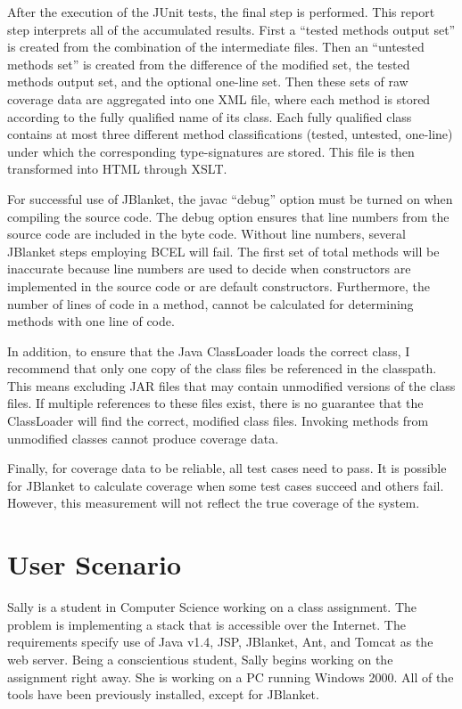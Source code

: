 After the execution of the JUnit tests, the final step is performed. This
report step interprets all of the accumulated results. First a ``tested
methods output set'' is created from the combination of the intermediate
files.  Then an ``untested methods set'' is created from the difference of
the modified set, the tested methods output set, and the optional one-line
set. Then these sets of raw coverage data are aggregated into one XML file,
where each method is stored according to the fully qualified name of its
class. Each fully qualified class contains at most three different method
classifications (tested, untested, one-line) under which the corresponding
type-signatures are stored. This file is then transformed into HTML through
XSLT.

For successful use of JBlanket, the javac ``debug'' option must be turned
on when compiling the source code. The debug option ensures that line
numbers from the source code are included in the byte code. Without line
numbers, several JBlanket steps employing BCEL will fail.  The first set of
total methods will be inaccurate because line numbers are used to decide
when constructors are implemented in the source code or are default
constructors.  Furthermore, the number of lines of code in a method, cannot
be calculated for determining methods with one line of code.

In addition, to ensure that the Java ClassLoader loads the correct class, I
recommend that only one copy of the class files be referenced in the
classpath.  This means excluding JAR files that may contain unmodified
versions of the class files. If multiple references to these files exist,
there is no guarantee that the ClassLoader will find the correct, modified
class files.  Invoking methods from unmodified classes cannot produce
coverage data.

Finally, for coverage data to be reliable, all test cases need to pass. It
is possible for JBlanket to calculate coverage when some test cases succeed
and others fail. However, this measurement will not reflect the true
coverage of the system.

\section{User Scenario}
Sally is a student in Computer Science working on a class assignment.  The
problem is implementing a stack that is accessible over the Internet.  The
requirements specify use of Java v1.4, JSP, JBlanket, Ant, and Tomcat as
the web server.  Being a conscientious student, Sally begins working on the
assignment right away.  She is working on a PC running Windows 2000. All of
the tools have been previously installed, except for JBlanket.

